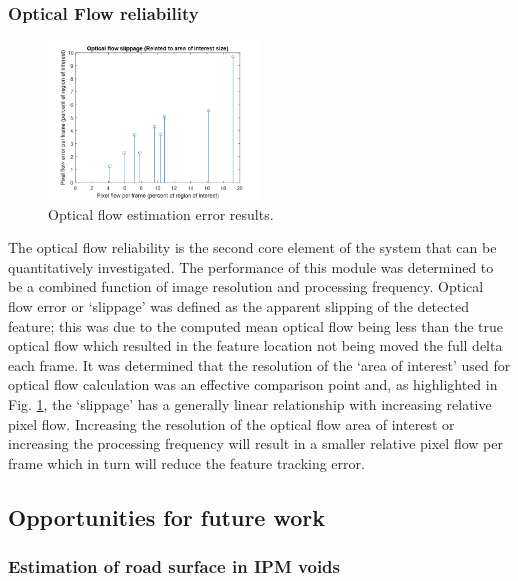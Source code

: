\documentclass[]{aiaa-tc}%
\begin{document}
\subsubsection{Optical Flow reliability}\label{s:performance:opticalflow}

\begin{figure} 
	\centering
	\includegraphics[width=0.5\textwidth]{Results/opticalFlowResults.png}
	\caption{Optical flow estimation error results.}
	\label{f:opticalFlowResults}
\end{figure}

The optical flow reliability is the second core element of the system that can be quantitatively investigated. The performance of this module was determined to be a combined function of image resolution and processing frequency. Optical flow error or `slippage' was defined as the apparent slipping of the detected feature; this was due to the computed mean optical flow being less than the true optical flow which resulted in the feature location not being moved the full delta each frame. It was determined that the resolution of the `area of interest' used for optical flow calculation was an effective comparison point and, as highlighted in Fig. \ref{f:opticalFlowResults}, the `slippage' has a generally linear relationship with increasing relative pixel flow. Increasing the resolution of the optical flow area of interest or increasing the processing frequency will result in a smaller relative pixel flow per frame which in turn will reduce the feature tracking error.

\subsection{Opportunities for future work} \label{s:improvements}

\subsubsection{Estimation of road surface in IPM voids}
\end{document}
